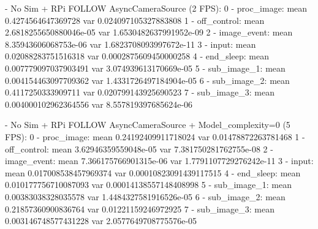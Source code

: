 - No Sim + RPi FOLLOW AsyncCameraSource (2 FPS):
0 - proc_image: mean 0.4274564647369728 var 0.024097105327883808
1 - off_control: mean 2.6818255650880046e-05 var 1.6530482637991952e-09
2 - image_event: mean 8.35943606068753e-06 var 1.6823708093997672e-11
3 - input: mean 0.02088283751516318 var 0.0002875609450000258
4 - end_sleep: mean 0.007779097037903491 var 3.074939613170669e-05
5 - sub_image_1: mean 0.004154463097709362 var 1.4331726497184904e-05
6 - sub_image_2: mean 0.4117250333909711 var 0.020799143925690523
7 - sub_image_3: mean 0.004000102962364556 var 8.557819397685624e-06

- No Sim + RPi FOLLOW AsyncCameraSource + Model_complexity=0 (5 FPS):
0 - proc_image: mean 0.24192409911718024 var 0.01478872263781468
1 - off_control: mean 3.62946359559048e-05 var 7.381750281762755e-08
2 - image_event: mean 7.366175766901315e-06 var 1.7791107729276242e-11
3 - input: mean 0.017008538457969374 var 0.00010823091439117515
4 - end_sleep: mean 0.010177756710087093 var 0.00014138557148408998
5 - sub_image_1: mean 0.00383038328035578 var 1.4484327581916526e-05
6 - sub_image_2: mean 0.21857360900836764 var 0.01221159246972925
7 - sub_image_3: mean 0.003146748577431228 var 2.0577649708775576e-05



